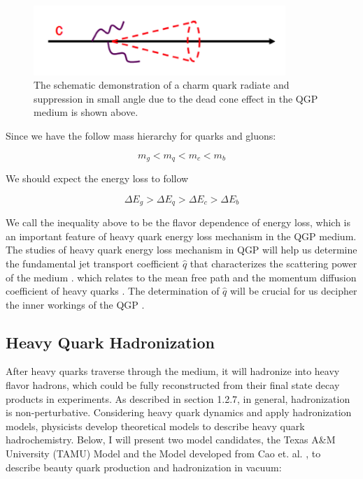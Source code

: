  \begin{figure}[hbtp]
\begin{center}
\includegraphics[width=0.85\textwidth]{Figures/Chapter1/CharmDeadCone.png}
\caption{The schematic demonstration of a charm quark radiate and suppression in small angle due to the dead cone effect in the QGP medium is shown above.}
\label{DeadConePic}
\end{center}
\end{figure}  

Since we have the follow mass hierarchy for quarks and gluons:

\begin{equation}
m_g < m_q < m_c < m_b
\end{equation}

We should expect the energy loss to follow

\begin{equation}
\Delta E_g > \Delta E_q > \Delta E_c >  \Delta E_b
\end{equation}

We call the inequality above to be the flavor dependence of energy loss, which is an important feature of heavy quark energy loss mechanism in the QGP medium. The studies of heavy quark energy loss mechanism in QGP will help us determine the fundamental jet transport coefficient $\hat q$ that characterizes the scattering power of the medium \cite{HQReview}. which relates to the mean free path and the momentum diffusion coefficient of heavy quarks \cite{qhatStudy}. The determination of $\hat q$ will be crucial for us decipher the inner workings of the QGP \cite{JetTransProbe}.

\subsection{Heavy Quark Hadronization}

After heavy quarks traverse through the medium, it will hadronize into heavy flavor hadrons, which could be fully reconstructed from their final state decay products in experiments. As described in section 1.2.7, in general, hadronization is non-perturbative. Considering heavy quark dynamics and apply hadronization models, physicists develop theoretical models to describe heavy quark hadrochemistry. Below, I will present two model candidates, the Texas A\&M University (TAMU) Model \cite{TAMUModel} and the Model developed from Cao et. al. \cite{CaoSunKo}, to describe beauty quark production and hadronization in vacuum:


